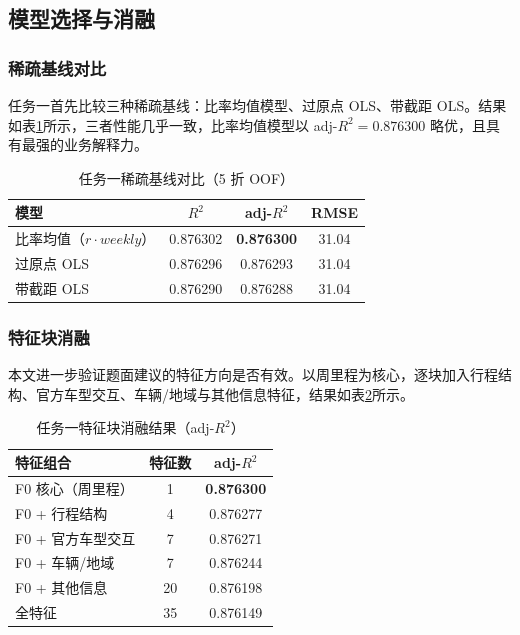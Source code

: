 \subsection{模型选择与消融}

\subsubsection{稀疏基线对比}

任务一首先比较三种稀疏基线：比率均值模型、过原点 OLS、带截距 OLS。结果如表\ref{tab:t1_baseline}所示，三者性能几乎一致，比率均值模型以 adj-$R^2=0.876300$ 略优，且具有最强的业务解释力。

\begin{table}[H]
\centering
\caption{任务一稀疏基线对比（5 折 OOF）}
\label{tab:t1_baseline}
\begin{tabular}{lccc}
\toprule
\textbf{模型} & \textbf{$R^2$} & \textbf{adj-$R^2$} & \textbf{RMSE} \\
\midrule
比率均值（$r\cdot weekly$） & 0.876302 & \textbf{0.876300} & 31.04 \\
过原点 OLS & 0.876296 & 0.876293 & 31.04 \\
带截距 OLS & 0.876290 & 0.876288 & 31.04 \\
\bottomrule
\end{tabular}
\end{table}

\subsubsection{特征块消融}

本文进一步验证题面建议的特征方向是否有效。以周里程为核心，逐块加入行程结构、官方车型交互、车辆/地域与其他信息特征，结果如表\ref{tab:t1_ablation}所示。

\begin{table}[H]
\centering
\caption{任务一特征块消融结果（adj-$R^2$）}
\label{tab:t1_ablation}
\begin{tabular}{lcc}
\toprule
\textbf{特征组合} & \textbf{特征数} & \textbf{adj-$R^2$} \\
\midrule
F0 核心（周里程） & 1 & \textbf{0.876300} \\
F0 + 行程结构 & 4 & 0.876277 \\
F0 + 官方车型交互 & 7 & 0.876271 \\
F0 + 车辆/地域 & 7 & 0.876244 \\
F0 + 其他信息 & 20 & 0.876198 \\
全特征 & 35 & 0.876149 \\
\bottomrule
\end{tabular}
\end{table}

